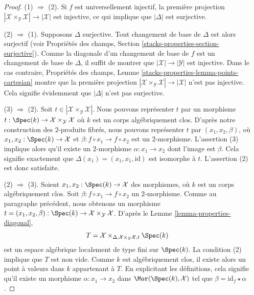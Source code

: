 \begin{proof}
(1) $\Rightarrow$ (2). Si $f$ est universellement injectif, la première
projection
$|\mathcal{X} \times_\mathcal{Y} \mathcal{X}| \to |\mathcal{X}|$
est injective, ce qui implique que $|\Delta|$ est surjective.

\medskip\noindent
(2) $\Rightarrow$ (1). Supposons $\Delta$ surjective. Tout changement
de base de $\Delta$ est alors surjectif (voir Propriétés des champs, Section
\ref{stacks-properties-section-surjective}).
Comme la diagonale d'un changement de base de $f$ est un changement
de base de $\Delta$, il suffit de montrer que
$|\mathcal{X}| \to |\mathcal{Y}|$ est injective.
Dans le cas contraire, Propriétés des champs, Lemme
\ref{stacks-properties-lemma-points-cartesian}
montre que la première projection
$|\mathcal{X} \times_\mathcal{Y} \mathcal{X}| \to |\mathcal{X}|$
n'est pas injective. Cela signifie évidemment que $|\Delta|$ n'est
pas surjective.

\medskip\noindent
(3) $\Rightarrow$ (2). Soit
$t \in |\mathcal{X} \times_\mathcal{Y} \mathcal{X}|$.
Nous pouvons représenter $t$ par un morphisme
$t : \Spec(k) \to \mathcal{X} \times_\mathcal{Y} \mathcal{X}$
où $k$ est un corps algébriquement clos.
D'après notre construction des $2$-produits fibrés, nous pouvons
représenter $t$ par $(x_1, x_2, \beta)$, où
$x_1, x_2 : \Spec(k) \to \mathcal{X}$ et
$\beta : f \circ x_1 \to f \circ x_2$ est un $2$-morphisme.
L'assertion (3) implique alors qu'il existe un $2$-morphisme
$\alpha : x_1 \to x_2$ dont l'image est $\beta$.
Cela signifie exactement que $\Delta(x_1) = (x_1, x_1, \text{id})$
est isomorphe à $t$. L'assertion (2) est donc satisfaite.

\medskip\noindent
(2) $\Rightarrow$ (3). Soient
$x_1, x_2 : \Spec(k) \to \mathcal{X}$ des morphismes, où $k$ est un
corps algébriquement clos. Soit
$\beta : f \circ x_1 \to f \circ x_2$ un $2$-morphisme.
Comme au paragraphe précédent, nous obtenons un morphisme
$t = (x_1, x_2, \beta) :
\Spec(k) \to \mathcal{X} \times_\mathcal{Y} \mathcal{X}$.
D'après le Lemme \ref{lemma-properties-diagonal},
$$
T = \mathcal{X}
\times_{\Delta, \mathcal{X} \times_\mathcal{Y} \mathcal{X}, t} \Spec(k)
$$
est un espace algébrique localement de type fini sur $\Spec(k)$.
La condition (2) implique que $T$ est non vide. Comme $k$ est
algébriquement clos, il existe alors un point à valeurs dans $k$
appartenant à $T$.
En explicitant les définitions, cela signifie qu'il existe un morphisme
$\alpha : x_1 \to x_2$ dans $\Mor(\Spec(k), \mathcal{X})$
tel que $\beta = \text{id}_f \star \alpha$.
\end{proof}

